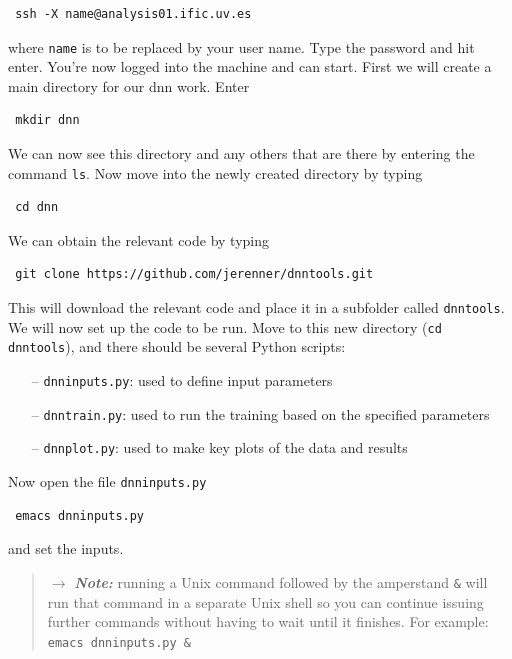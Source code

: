 \documentclass[10pt]{article}
\begin{document}
\begin{verbatim}
 ssh -X name@analysis01.ific.uv.es
\end{verbatim}

\noindent where \verb|name| is to be replaced by your user name.  Type the password and hit enter.  You're now 
logged into the machine and can start.  First we will create a main directory for our dnn work.  Enter

\begin{verbatim}
 mkdir dnn
\end{verbatim}

\noindent We can now see this directory and any others that are there by entering the command \verb|ls|.  Now move into the newly
created directory by typing

\begin{verbatim}
 cd dnn
\end{verbatim}

\noindent We can obtain the relevant code by typing

\begin{verbatim}
 git clone https://github.com/jerenner/dnntools.git
\end{verbatim}

\noindent This will download the relevant code and place it in a subfolder called \verb|dnntools|.  We will now set up the code
to be run.  Move to this new directory (\verb|cd dnntools|), and there should be several Python scripts:

\begin{enumerate}
	\item[--] \verb|dnninputs.py|: used to define input parameters
	\item[--] \verb|dnntrain.py|: used to run the training based on the specified parameters
	\item[--] \verb|dnnplot.py|: used to make key plots of the data and results
\end{enumerate}

\noindent Now open the file \verb|dnninputs.py|

\begin{verbatim}
 emacs dnninputs.py
\end{verbatim}

\noindent and set the inputs.

\begin{quotation}
	$\rightarrow$ \textbf{\emph{Note:}} running a Unix command followed by the amperstand \verb|&| will run that command in a separate Unix shell so you can continue issuing further commands without having to wait until it finishes.  For example: \verb|emacs dnninputs.py &|
\end{quotation}
\end{document}
